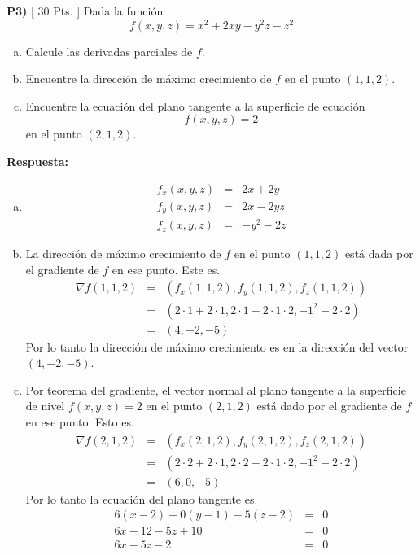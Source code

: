 \documentclass{article}
\begin{document}
\newpage
\noindent\textbf{P3) } \textsf{[ 30 Pts. ]} Dada la función
    $$f(x,y,z) = x^2+2xy-y^2z-z^2$$
  \begin{enumerate}[a)]
    \item Calcule las derivadas parciales de $f$.
    \item Encuentre la dirección de máximo crecimiento de $f$ en el punto $(1,1,2)$.
    \item Encuentre la ecuación del plano tangente a la superficie de ecuación
      $$f(x,y,z)=2$$
      en el punto $(2,1,2)$.
  \end{enumerate}

\vspace{5mm}
\noindent\textbf{Respuesta:}
\begin{enumerate}[a)]
  \item 
    \begin{eqnarray*}
      f_x(x,y,z) &=& 2x + 2y\\
      f_y(x,y,z) &=& 2x - 2yz\\
      f_z(x,y,z) &=& -y^2 - 2z
    \end{eqnarray*}
  \item La dirección de máximo crecimiento de $f$ en el punto $(1,1,2)$ está dada por el gradiente de $f$ en ese punto. Este es.
    \begin{eqnarray*}
      \nabla f(1,1,2) 
        &=& (f_x(1,1,2), f_y(1,1,2), f_z(1,1,2))\\
        &=& (2\cdot 1 + 2\cdot 1, 2\cdot 1 - 2\cdot 1\cdot 2, -1^2 - 2\cdot 2)\\
        &=& (4, -2, -5)
    \end{eqnarray*}
    Por lo tanto la dirección de máximo crecimiento es en la dirección del vector $(4,-2,-5)$.
  \item Por teorema del gradiente, el vector normal al plano tangente a la superficie de nivel $f(x,y,z)=2$ en el punto $(2,1,2)$ está dado por el gradiente de $f$ en ese punto. Esto es.
    \begin{eqnarray*}
      \nabla f(2,1,2) 
        &=& (f_x(2,1,2), f_y(2,1,2), f_z(2,1,2))\\
        &=& (2\cdot 2 + 2\cdot 1, 2\cdot 2 - 2\cdot 1\cdot 2, -1^2 - 2\cdot 2)\\
        &=& (6, 0, -5)
    \end{eqnarray*}
    Por lo tanto la ecuación del plano tangente es.
    \begin{eqnarray*}
      6(x-2) + 0(y-1) - 5(z-2) &=& 0\\
      6x - 12 - 5z + 10 &=& 0\\
      6x - 5z - 2 &=& 0
    \end{eqnarray*}
\end{enumerate}
\end{document}
